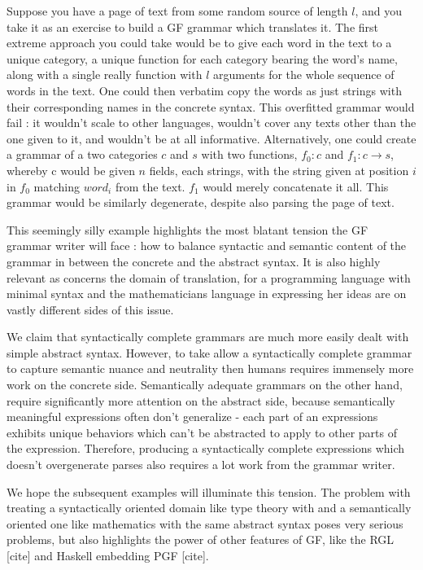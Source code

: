 Suppose you have a page of text from some random source of length $l$, and you
take it as an exercise to build a GF grammar which translates it. The first
extreme approach you could take would be to give each word in the text to a
unique category, a unique function for each category bearing the word's name,
along with a single really function with $l$ arguments for the whole sequence of
words in the text. One could then verbatim copy the words as just strings with
their corresponding names in the concrete syntax. This overfitted grammar would
fail : it wouldn't scale to other languages, wouldn't cover any texts other than
the one given to it, and wouldn't be at all informative. Alternatively, one
could create a grammar of a two categories $c$ and $s$ with two functions, $f_0
: c$ and $f_1 : c \rightarrow s$, whereby c would be given $n$ fields, each
strings, with the string given at position $i$ in $f_0$ matching $word_i$ from
the text. $f_1$ would merely concatenate it all. This grammar would be similarly
degenerate, despite also parsing the page of text.

This seemingly silly example highlights the most blatant tension the GF grammar
writer will face : how to balance syntactic and semantic content of the grammar
in between the concrete and the abstract syntax. It is also highly
relevant as concerns the domain of translation, for a programming language
with minimal syntax and the mathematicians language in expressing her ideas are
on vastly different sides of this issue.

We claim that syntactically complete grammars are much more easily dealt with
simple abstract syntax. However, to take allow a syntactically complete grammar
to capture semantic nuance and neutrality then humans requires immensely more
work on the concrete side. Semantically adequate grammars on the other hand,
require significantly more attention on the abstract side, because semantically
meaningful expressions often don't generalize - each part of an expressions
exhibits unique behaviors which can't be abstracted to apply to other parts of
the expression. Therefore, producing a syntactically complete expressions which
doesn't overgenerate parses also requires a lot work from the grammar writer.

We hope the subsequent examples will illuminate this tension. The problem with
treating a syntactically oriented domain like type theory with and a semantically
oriented one like mathematics with the same abstract syntax poses very serious
problems, but also highlights the power of other features of GF, like the RGL [cite]
and Haskell embedding PGF [cite].

